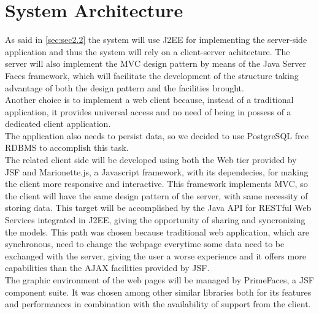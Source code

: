 \section{System Architecture} \label{sec:sec2.3}
As said in \autoref{sec:sec2.2} the system will use J2EE for implementing the server-side application and thus the system will rely on a client-server achitecture. The server will also implement the MVC design pattern by means of the Java Server Faces framework, which will facilitate the development of the structure taking advantage of both the design pattern and the facilities brought.\\
Another choice is to implement a web client because, instead of a traditional application, it provides universal access and no need of being in possess of a dedicated client application.\\
The application also needs to persist data, so we decided to use PostgreSQL free RDBMS to accomplish this task.\\
The related client side will be developed using both the Web tier provided by JSF and Marionette.js, a Javascript framework, with its dependecies, for making the client more responsive and interactive. This framework implements MVC, so the client will have the same design pattern of the server, with same necessity of storing data. This target will be accomplished by the Java API for RESTful Web Services integrated in J2EE, giving the opportunity of sharing and syncronizing the models. This path was chosen because traditional web application, which are synchronous, need to change the webpage everytime some data need to be exchanged with the server, giving the user a worse experience\cite{4} and it offers more capabilities than the AJAX facilities provided by JSF.\\
The graphic environment of the web pages will be managed by PrimeFaces, a JSF component suite. It was chosen among other similar libraries both for its features and performances in combination with the availability of support from the client.